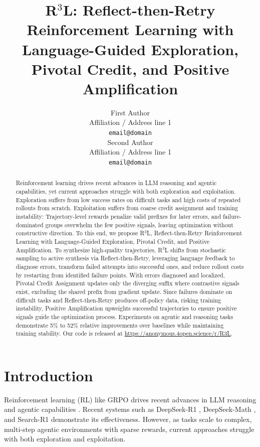 \documentclass[11pt]{article}
\title{R$^3$L: Reflect-then-Retry Reinforcement Learning with Language-Guided Exploration, Pivotal Credit, and Positive Amplification}
\author{First Author \\
  Affiliation / Address line 1 \\
  \texttt{email@domain} \\\And
  Second Author \\
  Affiliation / Address line 1 \\
  \texttt{email@domain} \\}
\theoremstyle{definition}
\theoremstyle{remark}
\begin{document}
\maketitle
\begin{abstract}
Reinforcement learning drives recent advances in LLM reasoning and agentic capabilities, yet current approaches struggle with both exploration and exploitation. Exploration suffers from low success rates on difficult tasks and high costs of repeated rollouts from scratch. Exploitation suffers from coarse credit assignment and training instability: Trajectory-level rewards penalize valid prefixes for later errors, and failure-dominated groups overwhelm the few positive signals, leaving optimization without constructive direction. To this end, we propose R$^3$L, Reflect-then-Retry Reinforcement Learning with Language-Guided Exploration, Pivotal Credit, and Positive Amplification. To synthesize high-quality trajectories, R$^3$L shifts from stochastic sampling to active synthesis via Reflect-then-Retry, leveraging language feedback to diagnose errors, transform failed attempts into successful ones, and reduce rollout costs by restarting from identified failure points. With errors diagnosed and localized, Pivotal Credit Assignment updates only the diverging suffix where contrastive signals exist, excluding the shared prefix from gradient update. Since failures dominate on difficult tasks and Reflect-then-Retry produces off-policy data, risking training instability, Positive Amplification upweights successful trajectories to ensure positive signals guide the optimization process. Experiments on agentic and reasoning tasks demonstrate 5\% to 52\% relative improvements over baselines while maintaining training stability. Our code is released at \url{https://anonymous.4open.science/r/R3L}. 
\end{abstract}


\section{Introduction}
Reinforcement learning (RL) like GRPO \cite{shao2024deepseekmath} drives recent advances in LLM reasoning and agentic capabilities \cite{cui2025enhancing,shi2025semantic,plaat2025agentic}. Recent systems such as DeepSeek-R1 \cite{guo2025deepseek}, DeepSeek-Math \cite{shao2024deepseekmath}, and Search-R1 \cite{jin2025search} demonstrate its effectiveness. However, as tasks scale to complex, multi-step agentic environments with sparse rewards, current approaches struggle with both exploration and exploitation.
\end{document}
